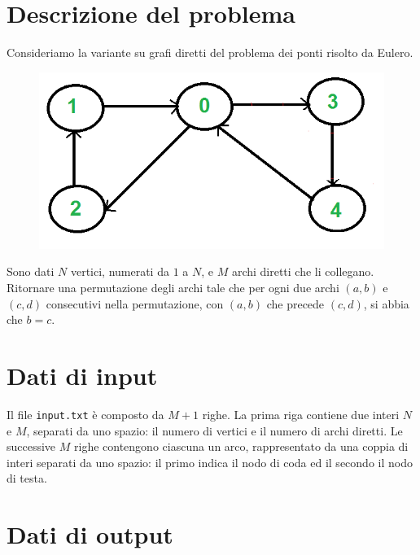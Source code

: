 \documentclass[a4paper,11pt]{article}
\begin{document}
\vspace{0.5cm}



\section*{Descrizione del problema}
   
Consideriamo la variante su grafi diretti del problema dei ponti risolto da Eulero.

\begin{figure}[h!]
  \centering
  \caption{}
  \includegraphics{euler-dir.png}
\end{figure}

Sono dati $N$ vertici, numerati da $1$ a $N$,
e $M$ archi diretti che li collegano.
Ritornare una permutazione degli archi tale che
per ogni due archi $(a,b)$ e $(c,d)$ consecutivi nella
permutazione, con $(a,b)$ che precede $(c,d)$, si abbia che $b = c$. 



\section*{Dati di input}
  
Il file \texttt{input.txt} è composto da $M+1$
righe. La prima riga contiene due interi $N$
e $M$, separati da uno spazio: il numero di vertici e il numero di archi diretti. Le successive $M$ righe
contengono ciascuna un arco, rappresentato da una
coppia di interi separati da uno spazio:
il primo indica il nodo di coda ed il secondo il nodo di testa.


\section*{Dati di output}
  
\end{document}
